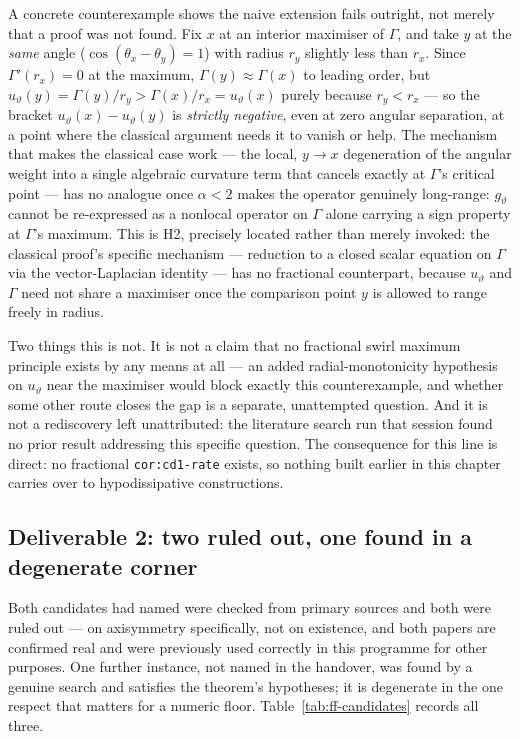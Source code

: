 A concrete counterexample shows the naive extension fails outright, not
merely that a proof was not found. Fix \(x\) at an interior maximiser of
\(\Gamma\), and take \(y\) at the \emph{same} angle (\(\cos(\theta_x-\theta_y)
=1\)) with radius \(r_y\) slightly less than \(r_x\). Since \(\Gamma'(r_x)=0\)
at the maximum, \(\Gamma(y)\approx\Gamma(x)\) to leading order, but
\(u_\vartheta(y)=\Gamma(y)/r_y>\Gamma(x)/r_x=u_\vartheta(x)\) purely because
\(r_y<r_x\) --- so the bracket \(u_\vartheta(x)-u_\vartheta(y)\) is
\emph{strictly negative}, even at zero angular separation, at a point where
the classical argument needs it to vanish or help. The mechanism that makes
the classical case work --- the local, \(y\to x\) degeneration of the angular
weight into a single algebraic curvature term that cancels exactly at
\(\Gamma\)'s critical point --- has no analogue once \(\alpha<2\) makes the
operator genuinely long-range: \(g_\vartheta\) cannot be re-expressed as a
nonlocal operator on \(\Gamma\) alone carrying a sign property at \(\Gamma\)'s
maximum. This is H2, precisely located rather than merely invoked: the
classical proof's specific mechanism --- reduction to a closed scalar
equation on \(\Gamma\) via the vector-Laplacian identity --- has no fractional
counterpart, because \(u_\vartheta\) and \(\Gamma\) need not share a
maximiser once the comparison point \(y\) is allowed to range freely in
radius.

Two things this is not. It is not a claim that no fractional swirl maximum
principle exists by any means at all --- an added radial-monotonicity
hypothesis on \(u_\vartheta\) near the maximiser would block exactly this
counterexample, and whether some other route closes the gap is a separate,
unattempted question. And it is not a rediscovery left unattributed: the
literature search run that session found no prior result addressing this
specific question. The consequence for this line is direct: no fractional
\texttt{cor:cd1-rate} exists, so nothing built earlier in this chapter carries
over to hypodissipative constructions.

\subsection{Deliverable 2: two ruled out, one found in a degenerate corner}
\label{sec:ff-s62-second}

Both candidates  had named were checked from primary sources and both
were ruled out --- on axisymmetry specifically, not on existence, and both
papers are confirmed real and were previously used correctly in this
programme for other purposes. One further instance, not named in the
handover, was found by a genuine search and satisfies the theorem's
hypotheses; it is degenerate in the one respect that matters for a numeric
floor. Table~\ref{tab:ff-candidates} records all three.

